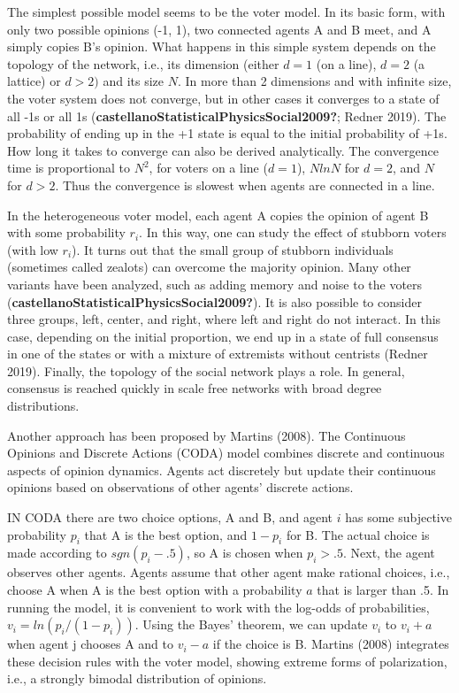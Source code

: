 \documentclass[
  a4paper,
  DIV=11,
  numbers=noendperiod,
  oneside]{scrreprt}
\begin{document}
The simplest possible model seems to be the voter model. In its basic
form, with only two possible opinions (-1, 1), two connected agents A
and B meet, and A simply copies B's opinion. What happens in this simple
system depends on the topology of the network, i.e., its dimension
(either \(d = 1\) (on a line), \(d = 2\) (a lattice) or \(d > 2)\) and
its size \(N\). In more than 2 dimensions and with infinite size, the
voter system does not converge, but in other cases it converges to a
state of all -1s or all 1s
(\textbf{castellanoStatisticalPhysicsSocial2009?}; Redner 2019). The
probability of ending up in the +1 state is equal to the initial
probability of +1s. How long it takes to converge can also be derived
analytically. The convergence time is proportional to \(N^{2}\), for
voters on a line (\(d = 1\)), \(NlnN\) for \(d = 2\), and \(N\) for
\(d > 2\). Thus the convergence is slowest when agents are connected in
a line.

In the heterogeneous voter model, each agent A copies the opinion of
agent B with some probability \(r_{i}\). In this way, one can study the
effect of stubborn voters (with low \(r_{i}\)). It turns out that the
small group of stubborn individuals (sometimes called zealots) can
overcome the majority opinion. Many other variants have been analyzed,
such as adding memory and noise to the voters
(\textbf{castellanoStatisticalPhysicsSocial2009?}). It is also possible
to consider three groups, left, center, and right, where left and right
do not interact. In this case, depending on the initial proportion, we
end up in a state of full consensus in one of the states or with a
mixture of extremists without centrists (Redner 2019). Finally, the
topology of the social network plays a role. In general, consensus is
reached quickly in scale free networks with broad degree distributions.

Another approach has been proposed by Martins (2008). The Continuous
Opinions and Discrete Actions (CODA) model combines discrete and
continuous aspects of opinion dynamics. Agents act discretely but update
their continuous opinions based on observations of other agents'
discrete actions.

IN CODA there are two choice options, A and B, and agent \(i\) has some
subjective probability \(p_{i}\) that A is the best option, and
\({1 - p}_{i}\) for B. The actual choice is made according to
\(sgn\left( p_{i} - .5 \right)\), so A is chosen when \(p_{i} > .5\).
Next, the agent observes other agents. Agents assume that other agent
make rational choices, i.e., choose A when A is the best option with a
probability \(a\) that is larger than .5. In running the model, it is
convenient to work with the log-odds of probabilities,
\(v_{i} = ln({p_{i}}/({1 - p_{i}}))\). Using the Bayes' theorem, we can
update \(v_{i}\) to \(v_{i} + a\) when agent j chooses A and to
\(v_{i} - a\) if the choice is B. Martins (2008) integrates these
decision rules with the voter model, showing extreme forms of
polarization, i.e., a strongly bimodal distribution of opinions.
\end{document}
